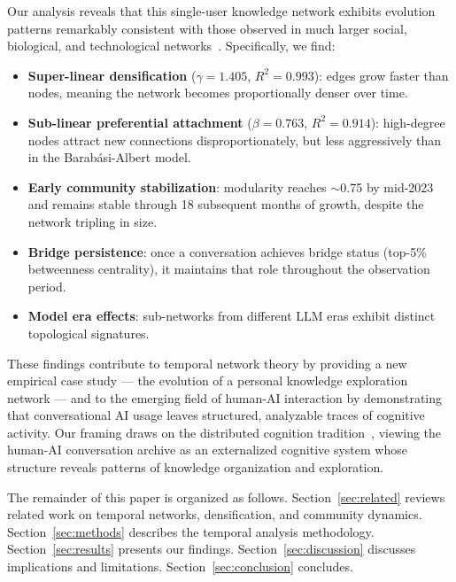 \documentclass[10pt,letterpaper]{article}
\begin{document}
Our analysis reveals that this single-user knowledge network exhibits evolution patterns remarkably consistent with those observed in much larger social, biological, and technological networks~\citep{leskovec2007graph,barabasi1999emergence,palla2007quantifying}. Specifically, we find:

\begin{itemize}
  \item \textbf{Super-linear densification} ($\gamma = 1.405$, $R^2 = 0.993$): edges grow faster than nodes, meaning the network becomes proportionally denser over time.
  \item \textbf{Sub-linear preferential attachment} ($\beta = 0.763$, $R^2 = 0.914$): high-degree nodes attract new connections disproportionately, but less aggressively than in the Barab\'asi-Albert model.
  \item \textbf{Early community stabilization}: modularity reaches $\sim$0.75 by mid-2023 and remains stable through 18 subsequent months of growth, despite the network tripling in size.
  \item \textbf{Bridge persistence}: once a conversation achieves bridge status (top-5\% betweenness centrality), it maintains that role throughout the observation period.
  \item \textbf{Model era effects}: sub-networks from different LLM eras exhibit distinct topological signatures.
\end{itemize}

These findings contribute to temporal network theory by providing a new empirical case study --- the evolution of a personal knowledge exploration network --- and to the emerging field of human-AI interaction by demonstrating that conversational AI usage leaves structured, analyzable traces of cognitive activity. Our framing draws on the distributed cognition tradition~\citep{hutchins1995cognition,clark1998extended}, viewing the human-AI conversation archive as an externalized cognitive system whose structure reveals patterns of knowledge organization and exploration.

The remainder of this paper is organized as follows. Section~\ref{sec:related} reviews related work on temporal networks, densification, and community dynamics. Section~\ref{sec:methods} describes the temporal analysis methodology. Section~\ref{sec:results} presents our findings. Section~\ref{sec:discussion} discusses implications and limitations. Section~\ref{sec:conclusion} concludes.


\end{document}
